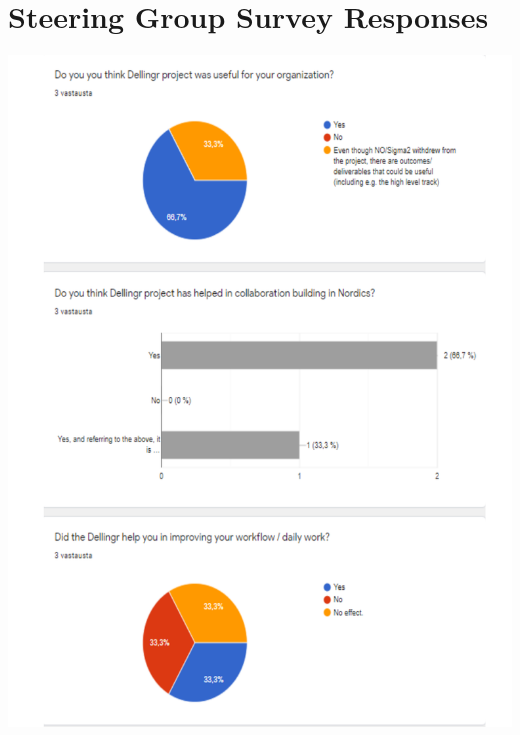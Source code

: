 \documentclass{article}
\begin{document}
\begin{appendices}
\begin{itemize}
\end{itemize}



\newpage
\section{Steering Group Survey Responses}
\label{app:sg-resp}

\begin{center}
\includegraphics[scale=0.7]{SG_responses_1.pdf}
\end{center}


\end{appendices}
\end{document}
